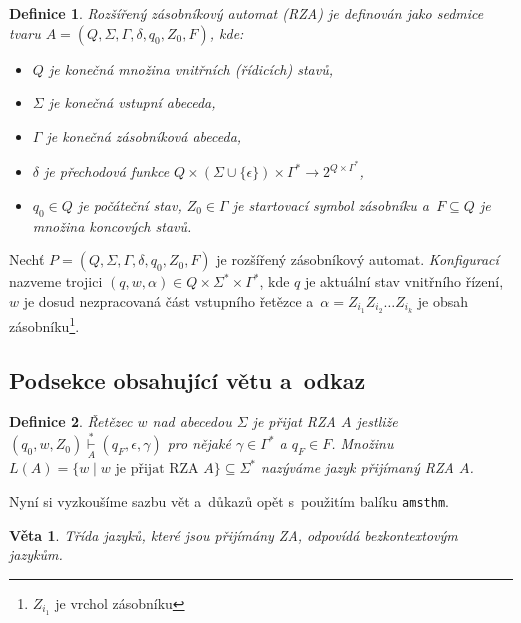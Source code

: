 \documentclass[twocolumn, 11pt]{article}
\newtheorem{definicia}{Definice}
\newtheorem{veta}{Věta}
\begin{document}
\begin{definicia}
    \label{def1}
    \textup{Rozšířený zásobníkový automat} (RZA) je definován jako sedmice tvaru $A=(Q, \Sigma, \Gamma, \delta, q_0, Z_0, F)$, kde:
    \begin{itemize}
        \item[$\bullet$] $Q$ je konečná množina \textup{vnitřních (řídicích) stavů},
        
        \item[$\bullet$] $\Sigma$ je konečná \textup{vstupní abeceda},
        
        \item[$\bullet$] $\Gamma$ je konečná \textup{zásobníková abeceda},
        
        \item[$\bullet$] $\delta$ je \textup{přechodová funkce} $Q \times (\Sigma \cup \{\epsilon\})\times \Gamma^{\ast} \rightarrow 2^{Q \times \Gamma^{\ast}}$,
        
         \item[$\bullet$] $q_0  \in Q$ je \textup{počáteční stav,} $Z_0 \in \Gamma$
         je \textup{startovací symbol zásobníku} a~$F \subseteq Q$
         je množina \textup{koncových stavů.}
         
     \end{itemize}
\end{definicia}
     
Nechť $P=(Q, \Sigma, \Gamma, \delta, q_0, Z_0, F)$ je rozšířený zásobníkový automat. \emph{Konfigurací} nazveme trojici $(q, w, \alpha)\in Q \times \Sigma^{\ast} \times \Gamma^{\ast}$, kde $q$ je aktuální stav vnitřního řízení, $w$ je dosud nezpracovaná část vstupního řetězce a~$\alpha = Z_{i_1} Z_{i_2} \dots Z_{i_k}$
je obsah zásobníku\footnote{$Z_{i_1}$ je vrchol zásobníku}.

 
\subsection{Podsekce obsahující větu a~odkaz}
\begin{definicia} 
    \label{def2}
    \textup{Řetězec $w$ nad abecedou $\Sigma$ je přijat RZA} $A$ jestliže $(q_0, w, Z_0) \overset{*}{\underset{A}{\vdash}} (q_F,\epsilon, \gamma)$ pro nějaké $\gamma \in \Gamma^{\ast}$ a $q_F \in F$. Množinu $L(A) = \{w \mid w \mbox{ je přijat RZA } A\} \subseteq \Sigma^{\ast}$ nazýváme \textup{jazyk přijímaný RZA} $A$.
\end{definicia}


Nyní si vyzkoušíme sazbu vět a~důkazů opět s~použitím balíku \verb|amsthm|.
\begin{veta} 
    Třída jazyků, které jsou přijímány ZA, odpovídá
    \textup{bezkontextovým jazykům}.
\end{veta}
\end{document}
